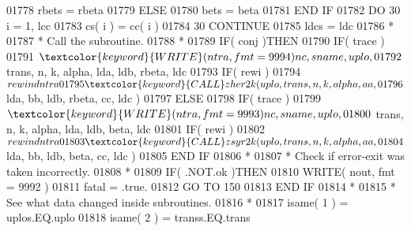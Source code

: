 \begin{DoxyCode}
01778                            rbets = rbeta
01779                         \textcolor{keywordflow}{ELSE}
01780                            bets = beta
01781 \textcolor{keywordflow}{                        END IF}
01782                         \textcolor{keywordflow}{DO} 30 i = 1, lcc
01783                            cs( i ) = cc( i )
01784    30                   \textcolor{keywordflow}{CONTINUE}
01785                         ldcs = ldc
01786 \textcolor{comment}{*}
01787 \textcolor{comment}{*                       Call the subroutine.}
01788 \textcolor{comment}{*}
01789                         \textcolor{keywordflow}{IF}( conj )\textcolor{keywordflow}{THEN}
01790                            \textcolor{keywordflow}{IF}( trace )
01791      $                        \textcolor{keyword}{WRITE}( ntra, fmt = 9994 )nc, sname, uplo,
01792      $                        trans, n, k, alpha, lda, ldb, rbeta, ldc
01793                            \textcolor{keywordflow}{IF}( rewi )
01794      $                        rewind ntra
01795                            \textcolor{keyword}{CALL }zher2k( uplo, trans, n, k, alpha, aa,
01796      $                                  lda, bb, ldb, rbeta, cc, ldc )
01797                         \textcolor{keywordflow}{ELSE}
01798                            \textcolor{keywordflow}{IF}( trace )
01799      $                        \textcolor{keyword}{WRITE}( ntra, fmt = 9993 )nc, sname, uplo,
01800      $                        trans, n, k, alpha, lda, ldb, beta, ldc
01801                            \textcolor{keywordflow}{IF}( rewi )
01802      $                        rewind ntra
01803                            \textcolor{keyword}{CALL }zsyr2k( uplo, trans, n, k, alpha, aa,
01804      $                                  lda, bb, ldb, beta, cc, ldc )
01805 \textcolor{keywordflow}{                        END IF}
01806 \textcolor{comment}{*}
01807 \textcolor{comment}{*                       Check if error-exit was taken incorrectly.}
01808 \textcolor{comment}{*}
01809                         \textcolor{keywordflow}{IF}( .NOT.ok )\textcolor{keywordflow}{THEN}
01810                            \textcolor{keyword}{WRITE}( nout, fmt = 9992 )
01811                            fatal = .true.
01812                            \textcolor{keywordflow}{GO TO} 150
01813 \textcolor{keywordflow}{                        END IF}
01814 \textcolor{comment}{*}
01815 \textcolor{comment}{*                       See what data changed inside subroutines.}
01816 \textcolor{comment}{*}
01817                         isame( 1 ) = uplos.EQ.uplo
01818                         isame( 2 ) = transs.EQ.trans

\end{DoxyCode}
